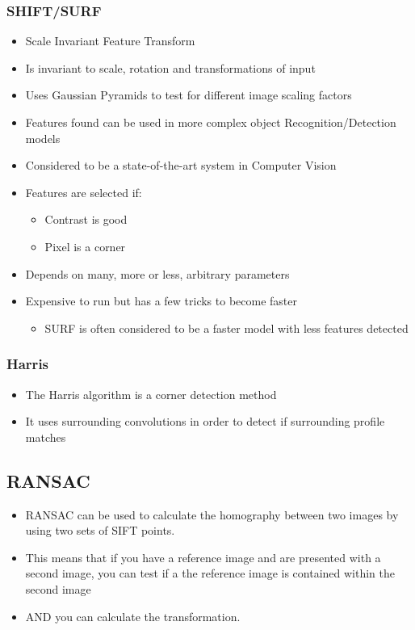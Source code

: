 \documentclass[a4paper]{article}
\begin{document}
\subsubsection{SHIFT/SURF}
\label{sec-2-2-2}
\begin{itemize}
\item Scale Invariant Feature Transform
\item Is invariant to scale, rotation and transformations of input
\item Uses Gaussian Pyramids to test for different image scaling factors
\item Features found can be used in more complex object Recognition/Detection models
\item Considered to be a state-of-the-art system in Computer Vision
\item Features are selected if:
\begin{itemize}
\item Contrast is good
\item Pixel is a corner
\end{itemize}
\item Depends on many, more or less, arbitrary parameters
\item Expensive to run but has a few tricks to become faster
\begin{itemize}
\item SURF is often considered to be a faster model with less features detected
\end{itemize}
\end{itemize}
\subsubsection{Harris}
\label{sec-2-2-3}
\begin{itemize}
\item The Harris algorithm is a corner detection method
\item It uses surrounding convolutions in order to detect if surrounding profile matches
\end{itemize}

\subsection{RANSAC}
\label{sec-2-3}
\begin{itemize}
\item RANSAC can be used to calculate the homography between two images by using two sets of SIFT points.
\item This means that if you have a reference image and are presented with a second image, you can test if a the reference image is contained within the second image
\item AND you can calculate the transformation.
\end{itemize}
\end{document}
